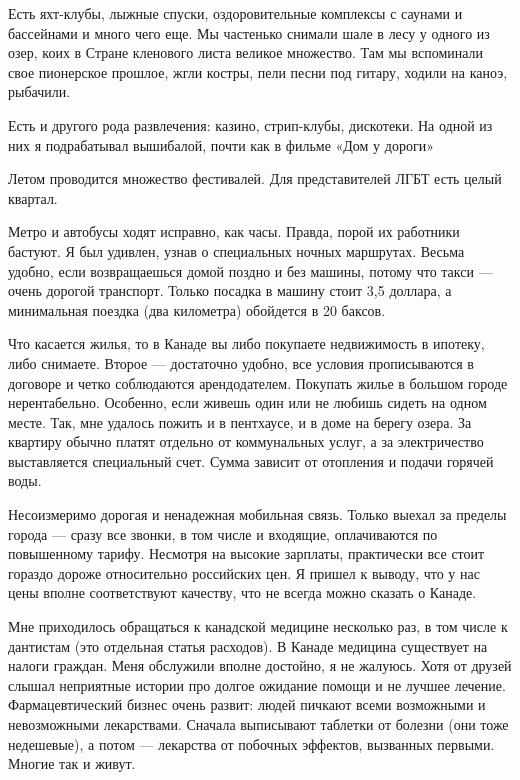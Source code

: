 Есть яхт-клубы, лыжные спуски, оздоровительные комплексы с саунами и бассейнами и много чего еще. Мы частенько снимали шале в лесу у одного из озер, коих в Стране кленового листа великое множество. Там мы вспоминали свое пионерское прошлое, жгли костры, пели песни под гитару, ходили на каноэ, рыбачили.

\begin{fancyquotes}
    Есть и другого рода развлечения: казино, стрип-клубы, дискотеки. На одной из них я подрабатывал вышибалой, почти как в фильме «Дом у дороги»
\end{fancyquotes}

Летом проводится множество фестивалей. Для представителей ЛГБТ есть целый квартал.

Метро и автобусы ходят исправно, как часы. Правда, порой их работники бастуют. Я был удивлен, узнав о специальных ночных маршрутах. Весьма удобно, если возвращаешься домой поздно и без машины, потому что такси — очень дорогой транспорт. Только посадка в машину стоит 3,5 доллара, а минимальная поездка (два километра) обойдется в 20 баксов.

Что касается жилья, то в Канаде вы либо покупаете недвижимость в ипотеку, либо снимаете. Второе — достаточно удобно, все условия прописываются в договоре и четко соблюдаются арендодателем. Покупать жилье в большом городе нерентабельно. Особенно, если живешь один или не любишь сидеть на одном месте. Так, мне удалось пожить и в пентхаусе, и в доме на берегу озера. За квартиру обычно платят отдельно от коммунальных услуг, а за электричество выставляется специальный счет. Сумма зависит от отопления и подачи горячей воды.

Несоизмеримо дорогая и ненадежная мобильная связь. Только выехал за пределы города — сразу все звонки, в том числе и входящие, оплачиваются по повышенному тарифу. Несмотря на высокие зарплаты, практически все стоит гораздо дороже относительно российских цен. Я пришел к выводу, что у нас цены вполне соответствуют качеству, что не всегда можно сказать о Канаде.

Мне приходилось обращаться к канадской медицине несколько раз, в том числе к дантистам (это отдельная статья расходов). В Канаде медицина существует на налоги граждан. Меня обслужили вполне достойно, я не жалуюсь. Хотя от друзей слышал неприятные истории про долгое ожидание помощи и не лучшее лечение. Фармацевтический бизнес очень развит: людей пичкают всеми возможными и невозможными лекарствами. Сначала выписывают таблетки от болезни (они тоже недешевые), а потом — лекарства от побочных эффектов, вызванных первыми. Многие так и живут.


